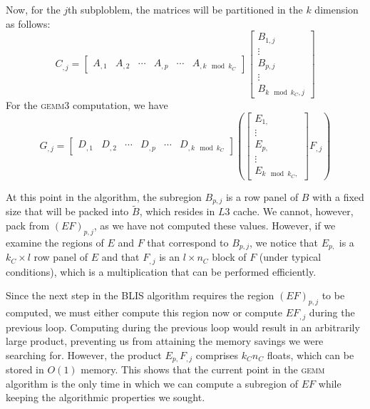 \documentclass[12pt]{article}
\newcommand*{\gemmt}{{\textsc{gemm3}}}
\newcommand*{\gemm}{{\textsc{gemm}}}
\begin{document}
Now, for the $j$th subploblem, the matrices will be partitioned in the $k$ dimension as follows:
\begin{equation*}
  C_{,j}
  =
  \left[\begin{array}{c|c|c|c|c|c}
    A_{,1}&A_{,2}&\cdots&A_{,p}&\cdots&A_{,k \mod k_C}
  \end{array}\right]
  \left[\begin{array}{c}
    B_{1,j}\\\hline
    \vdots\\\hline
    B_{p,j}\\\hline
    \vdots\\\hline
    B_{k \mod k_C,j}
  \end{array}\right]
\end{equation*}
For the \gemmt{} computation, we have
\begin{equation*}
  G_{,j}
  =
  \left[\begin{array}{c|c|c|c|c|c}
    D_{,1}&D_{,2}&\cdots&D_{,p}&\cdots&D_{,k \mod k_C}
  \end{array}\right]
  \left(
  \left[\begin{array}{c}
          E_{1,}\\\hline
          \vdots\\\hline
          E_{p,}\\\hline
          \vdots\\\hline
          E_{k \mod k_C,}
  \end{array}\right]
  F_{,j}
  \right)
\end{equation*}

At this point in the algorithm, the subregion $B_{p, j}$ is a row panel of $B$ with a fixed size that will be packed into $\widetilde{B}$, which resides in $L3$ cache.
We cannot, however, pack from $(EF)_{p, j}$, as we have not computed these values.
However, if we examine the regions of $E$ and $F$ that correspond to $B_{p, j}$, we notice that $E_{p,}$ is a $k_C \times l$ row panel of $E$ and that $F_{,j}$ is an $l \times n_C$ block of $F$ (under typical conditions), which is a multiplication that can be performed efficiently.

Since the next step in the BLIS algorithm requires the region $(EF)_{p, j}$ to be computed, we must either compute this region now or compute $EF_{,j}$ during the previous loop.
Computing during the previous loop would result in an arbitrarily large product, preventing us from attaining the memory savings we were searching for.
However, the product $E_{p,}F_{,j}$ comprises $k_Cn_C$ floats, which can be stored in $O(1)$ memory.
This shows that the current point in the \gemm{} algorithm is the only time in which we can compute a subregion of $EF$ while keeping the algorithmic properties we sought.
\end{document}
